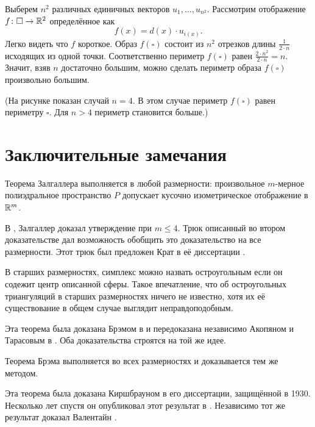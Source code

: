 Выберем $n^2$ различных единичных векторов 
$u_1,\dots,u_{n^2}$.
Рассмотрим отображение $f\colon\square\to\mathbb{R}^2$ 
определённое как
$$f(x)=d(x)\cdot u_{i(x)}.$$
Легко видеть что $f$ короткое.
Образ $f(\square)$ состоит из $n^2$ отрезков длины $\tfrac{1}{2{\cdot}n}$ исходящих из одной точки.
Соответственно периметр $f(\square)$ равен 
$\tfrac{2{\cdot}n^2}{2{\cdot} n}= n$.
Значит, взяв $n$ достаточно большим, 
можно сделать периметр образа $f(\square)$ произвольно большим.

(На рисунке показан случай $n=4$.  
В этом случае периметр $f(\square)$ равен периметру $\square$.  
Для $n>4$ периметр становится больше.)

\section*{Заключительные замечания}\label{sec:pdp-comments}


Теорема Залгаллера выполняется в любой размерности: 
произвольное $m$-мерное полиэдральное пространство $P$ 
допускает кусочно изометрическое отображение в $\mathbb{R}^m$.

В \cite{zalgaller-PL}, Залгаллер доказал утверждение при $m\le 4$.
Трюк описанный во втором доказательстве дал возможность обобщить это доказательство на все размерности.
Этот трюк был предложен Крат в её диссертации \cite{krat}.

В старших размерностях, симплекс можно назвать остроугольным если он содежит центр описанной сферы.
Такое впечатление, что об остроугольных триангуляций в старших размерностях
ничего не известно, 
хотя их её существование в общем случае выглядит неправдоподобным.

Эта теорема была доказана Брэмом в \cite{brehm}
и передоказана независимо Акопяном и Тарасовым в \cite{akopyan-tarasov}.
Оба доказательства строятся на той же идее.

Теорема Брэма выполняется во всех размерностях и доказывается тем же методом.

Эта теорема была доказана Киршбрауном в его диссертации, защищённой в 1930. 
Несколько лет спустя он опубликовал этот результат в \cite{kirszbraun}.
Независимо тот же результат доказал Валентайн \cite{valentine}.

